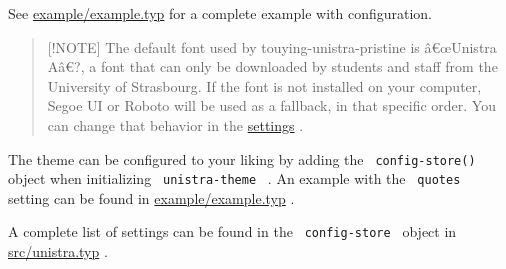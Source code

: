 See
\href{https://github.com/typst/packages/raw/main/packages/preview/touying-unistra-pristine/1.2.0/example/example.typ}{example/example.typ}
for a complete example with configuration.

\begin{Shaded}
\begin{Highlighting}[]

\NormalTok{  ),}
\NormalTok{)}





\end{Highlighting}
\end{Shaded}

\begin{quote}
{[}!NOTE{]} The default font used by touying-unistra-pristine is
â€œUnistra Aâ€?, a font that can only be downloaded by students and
staff from the University of Strasbourg. If the font is not installed on
your computer, Segoe UI or Roboto will be used as a fallback, in that
specific order. You can change that behavior in the
\href{https://github.com/typst/packages/raw/main/packages/preview/touying-unistra-pristine/1.2.0/\#Configuration}{settings}
.
\end{quote}

The theme can be configured to your liking by adding the
\texttt{\ config-store()\ } object when initializing
\texttt{\ unistra-theme\ } . An example with the \texttt{\ quotes\ }
setting can be found in
\href{https://github.com/typst/packages/raw/main/packages/preview/touying-unistra-pristine/1.2.0/example/example.typ}{example/example.typ}
.

A complete list of settings can be found in the
\texttt{\ config-store\ } object in
\href{https://github.com/typst/packages/raw/main/packages/preview/touying-unistra-pristine/1.2.0/src/unistra.typ}{src/unistra.typ}
.

